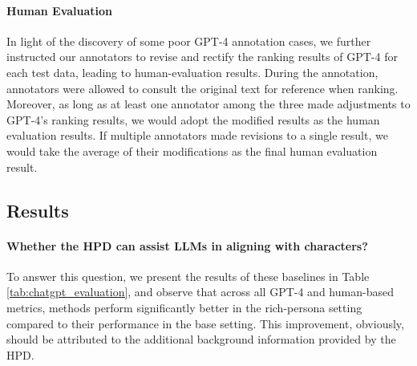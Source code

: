 \documentclass[11pt]{article}
\begin{document}
\paragraph{Human Evaluation}
In light of the discovery of some poor GPT-4 annotation cases, we further instructed our annotators to revise and rectify the ranking results of GPT-4 for each test data, leading to human-evaluation results. During the annotation, annotators were allowed to consult the original text for reference when ranking. Moreover, as long as at least one annotator among the three made adjustments to GPT-4's ranking results, we would adopt the modified results as the human evaluation results. If multiple annotators made revisions to a single result, we would take the average of their modifications as the final human evaluation result.











 
























\subsection{Results}
\label{experimental_result}

 
\paragraph{Whether the HPD can assist LLMs in aligning with characters?}

To answer this question, we present the results of these baselines in 
Table \ref{tab:chatgpt_evaluation}, and observe that across all GPT-4 and human-based metrics, methods perform significantly better in the rich-persona setting compared to their performance in the base setting. This improvement, obviously, should be attributed to the additional background information provided by the HPD. 
\end{document}
